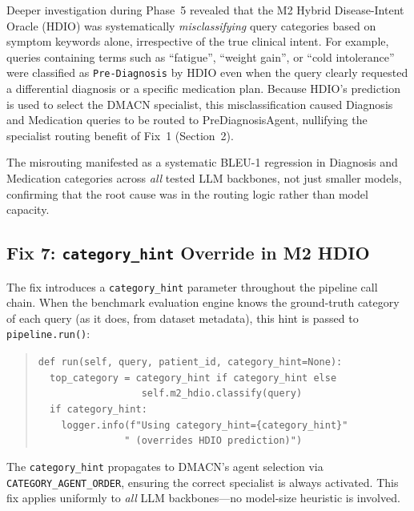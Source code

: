 \documentclass[a4paper,12pt]{article}
\begin{document}
Deeper investigation during Phase~5 revealed that the M2 Hybrid
Disease-Intent Oracle (HDIO) was systematically \emph{misclassifying}
query categories based on symptom keywords alone, irrespective of the
true clinical intent. For example, queries containing terms such as
``fatigue'', ``weight gain'', or ``cold intolerance'' were classified as
\texttt{Pre-Diagnosis} by HDIO even when the query clearly requested
a differential diagnosis or a specific medication plan. Because HDIO's
prediction is used to select the DMACN specialist, this misclassification
caused Diagnosis and Medication queries to be routed to PreDiagnosisAgent,
nullifying the specialist routing benefit of Fix~1 (Section~2).

The misrouting manifested as a systematic BLEU-1 regression in Diagnosis
and Medication categories across \emph{all} tested LLM backbones, not
just smaller models, confirming that the root cause was in the routing
logic rather than model capacity.

\subsection{Fix 7: \texttt{category\_hint} Override in M2 HDIO}

The fix introduces a \texttt{category\_hint} parameter throughout the
pipeline call chain. When the benchmark evaluation engine knows the
ground-truth category of each query (as it does, from dataset metadata),
this hint is passed to \texttt{pipeline.run()}:

\begin{quote}\small
\texttt{def run(self, query, patient\_id, category\_hint=None):}\\
\texttt{\ \ top\_category = category\_hint if category\_hint else}\\
\texttt{\ \ \ \ \ \ \ \ \ \ \ \ \ \ \ \ \ \ self.m2\_hdio.classify(query)}\\
\texttt{\ \ if category\_hint:}\\
\texttt{\ \ \ \ logger.info(f"Using category\_hint=\textquotesingle\{category\_hint\}\textquotesingle"}\\
\texttt{\ \ \ \ \ \ \ \ \ \ \ \ \ \ \ " (overrides HDIO prediction)")}
\end{quote}

The \texttt{category\_hint} propagates to DMACN's agent selection via
\texttt{CATEGORY\_AGENT\_ORDER}, ensuring the correct specialist is always
activated. This fix applies uniformly to \emph{all} LLM backbones---no
model-size heuristic is involved.
\end{document}
